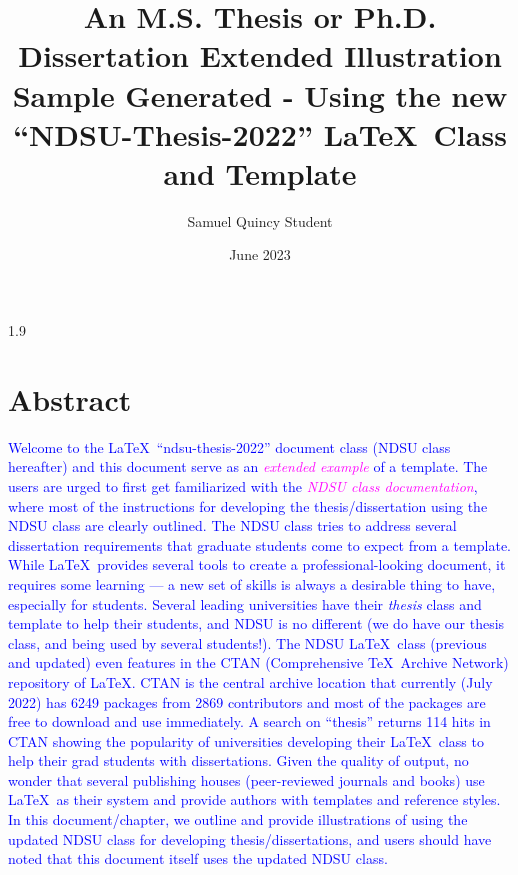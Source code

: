 \documentclass[phd]{ndsu-thesis-2022}
\title{An M.S. Thesis or Ph.D. Dissertation Extended Illustration Sample Generated - Using the new ``NDSU-Thesis-2022'' \LaTeX\ Class and Template}
\author{Samuel Quincy Student}
\date{June 2023}
\newcommand\myspacing{1.9} %
\newcommand\italk[1]{\textcolor{blue}{#1}}  %
\begin{document}
\begin{spacing}{\myspacing}      %



\section{Abstract}
\italk{Welcome to the \LaTeX\ ``ndsu-thesis-2022'' document class (NDSU class hereafter) and this document serve as an \textcolor{magenta}{\emph{extended example}} of a template. The users are urged to first get familiarized with the \textcolor{magenta}{\emph{NDSU class documentation}}, where most of the instructions for developing the thesis/dissertation using the NDSU class are clearly outlined. The NDSU class tries to address several dissertation requirements that graduate students come to expect from a template. While \LaTeX\ provides several tools to create a professional-looking document, it requires some learning --- a new set of skills is always a desirable thing to have, especially for students. Several leading universities have their \emph{thesis} class and template to help their students, and NDSU is no different (we do have our thesis class, and being used by several students!). The NDSU \LaTeX\ class (previous and updated) even features in the CTAN (Comprehensive \TeX\ Archive Network) repository of \LaTeX. CTAN is the central archive location that currently (July 2022) has 6249 packages from 2869 contributors and most of the packages are free to download and use immediately. A search on ``thesis'' returns 114 hits in CTAN showing the popularity of universities developing their \LaTeX\ class to help their grad students with dissertations. Given the quality of output, no wonder that several publishing houses (peer-reviewed journals and books) use \LaTeX\ as their system and provide authors with templates and reference styles. In this document/chapter, we outline and provide illustrations of using the updated NDSU class for developing thesis/dissertations, and users should have noted that this document itself uses the updated NDSU class.\\ 
}


\end{spacing}
\end{document}
